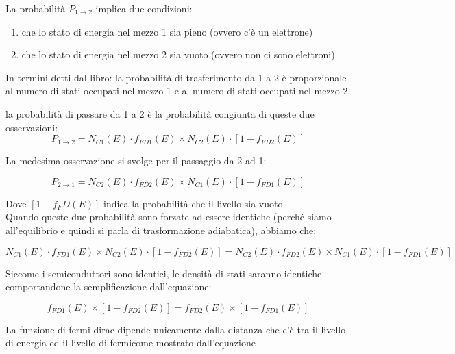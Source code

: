 La probabilità $P_{1 \rightarrow 2}$ implica due condizioni:
\begin{enumerate}
    \item che lo stato di energia nel mezzo 1 sia pieno (ovvero c'è un elettrone)
    \item che lo stato di energia nel mezzo 2 sia vuoto (ovvero non ci sono elettroni)
\end{enumerate}
\begin{psbox}
    In termini detti dal libro: la probabilità di trasferimento da 1 a 2 è proporzionale al numero di stati occupati nel mezzo 1 e al numero di stati occupati nel mezzo 2.
\end{psbox}

la probabilità di passare da 1 a 2 è la probabilità congiunta di queste due osservazioni:
\begin{equation}
P_{1 \rightarrow 2} = N_{C1} (E) \cdot f_{FD1} (E) \times N_{C2} (E) \cdot \left[ 1 - f_{FD2}(E) \right] 
\end{equation}

La medesima osservazione si svolge per il passaggio da 2 ad 1:

\begin{equation}
	P_{2 \rightarrow 1} = N_{C2}(E) \cdot f_{FD2}(E) \times N_{C1}(E) \cdot  \left[ 1 - f_{FD1}(E)\right] 
\end{equation}

Dove $\left[1-f_FD (E)\right]$ indica la probabilità che il livello sia vuoto.\\
Quando queste due probabilità sono forzate ad essere identiche (perché siamo all'equilibrio e quindi si parla di trasformazione adiabatica), abbiamo che: 

\begin{equation}
	N_{C1}(E) \cdot f_{FD1}(E) \times N_{C2}(E) \cdot \left[ 1-f_{FD2}(E) \right] = N_{C2}(E) \cdot f_{FD2}(E) \times N_{C1}(E) \cdot \left[ 1-f_{FD1}(E)\right]
\end{equation}

Siccome i semiconduttori sono identici, le densità di stati saranno identiche comportandone la semplificazione dall'equazione:

\begin{equation}
	f_{FD1}(E) \times \left[1-f_{FD2}(E)\right]=f_{FD2}(E) \times \left[1-f_{FD1}(E)\right]
\end{equation}

La funzione di fermi dirac dipende unicamente dalla distanza che c'è tra il livello di energia ed il livello di fermicome mostrato dall'equazione

